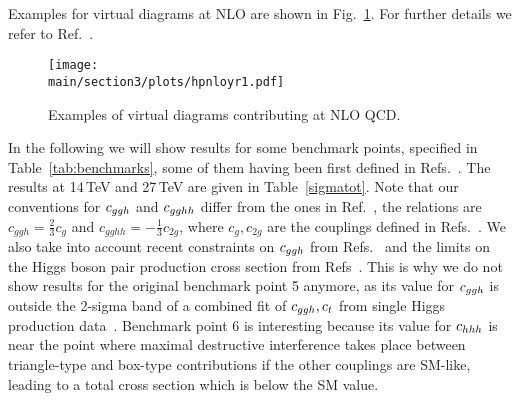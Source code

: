 Examples for virtual diagrams at NLO are shown in
Fig.~\ref{fig:virt_examples}.
For further details we refer to Ref.~\cite{Buchalla:2018yce}.
\begin{figure}[htb]
\begin{center}
\texttt{[image: \\main/section3/plots/hpnloyr1.pdf]}
\end{center}
\caption{Examples of virtual diagrams contributing at NLO QCD.}
\label{fig:virt_examples}
\end{figure}



In the following we will show results for some benchmark points, specified in Table~\ref{tab:benchmarks}, 
some of them having been first defined in Refs.~\cite{Carvalho:2015ttv}.
The results at 14\,TeV and 27\,TeV are given in Table~\ref{sigmatot}.
Note that our conventions for $c_{ggh}$ and $c_{gghh}$ differ from the ones in
Ref.~\cite{Carvalho:2015ttv,Carvalho:2016rys}, the relations are $c_{ggh}= \frac{2}{3}c_g $
and $c_{gghh}=-\frac{1}{3}c_{2g}$, where $c_g,c_{2g}$ are the
couplings defined in Refs.~\cite{Carvalho:2015ttv,Carvalho:2016rys}.
We also take into account recent constraints on $c_{ggh}$ from
Refs.~\cite{CMS-PAS-HIG-17-031,deBlas:2018tjm}
and the  limits on the Higgs boson pair production cross section
from Refs~\cite{CMS-PAS-HIG-17-030,ATLAS-CONF-2018-043}.
This is why we do not show results for the original benchmark point 5
anymore, as its value for $c_{ggh}$ is outside the 2-sigma band of a
combined fit of $c_{ggh},c_{t}$ from single Higgs production
data~\cite{CMS-PAS-HIG-17-031,deBlas:2018tjm}.
Benchmark point 6 is interesting because its value for $c_{hhh}$ is near
the point where maximal destructive interference takes place between
triangle-type and box-type contributions if the other couplings are SM-like, leading to a total cross
section which is below the SM value.


